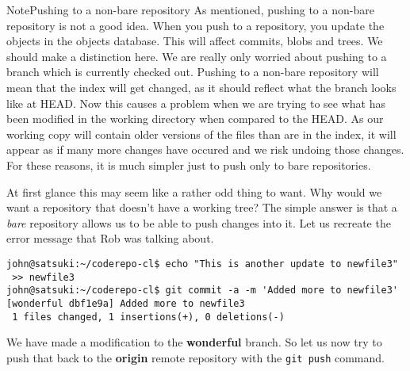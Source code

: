 \begin{callout}{Note}{Pushing to a non-bare repository}
As mentioned, pushing to a non-bare repository is not a good idea.  When you push to a repository, you update the objects in the objects database.  This will affect commits, blobs and trees.  We should make a distinction here.  We are really only worried about pushing to a branch which is currently checked out.  Pushing to a non-bare repository will mean that the index will get changed, as it should reflect what the branch looks like at HEAD.  
\newline
\newline
Now this causes a problem when we are trying to see what has been modified in the working directory when compared to the HEAD.  As our working copy will contain older versions of the files than are in the index, it will appear as if many more changes have occured and we risk undoing those changes.  For these reasons, it is much simpler just to push only to bare repositories.
\end{callout}

At first glance this may seem like a rather odd thing to want.  Why would we want a repository that doesn't have a working tree?  The simple answer is that a \emph{bare} repository allows us to be able to push changes into it.  Let us recreate the error message that Rob was talking about.

\begin{Verbatim}
john@satsuki:~/coderepo-cl$ echo "This is another update to newfile3" 
 >> newfile3
john@satsuki:~/coderepo-cl$ git commit -a -m 'Added more to newfile3'
[wonderful dbf1e9a] Added more to newfile3
 1 files changed, 1 insertions(+), 0 deletions(-)
\end{Verbatim}

We have made a modification to the \textbf{wonderful} branch.  So let us now try to push that back to the \textbf{origin} remote repository with the \texttt{git push} command.
 
